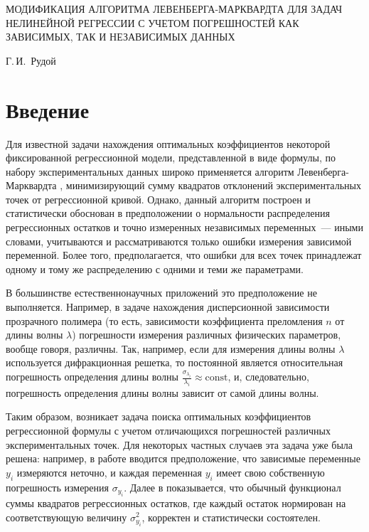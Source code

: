 \documentclass[11pt,a4paper]{article}
\begin{document}
\begin{center}
  МОДИФИКАЦИЯ АЛГОРИТМА ЛЕВЕНБЕРГА-МАРКВАРДТА ДЛЯ ЗАДАЧ НЕЛИНЕЙНОЙ РЕГРЕССИИ С УЧЕТОМ
  ПОГРЕШНОСТЕЙ КАК ЗАВИСИМЫХ, ТАК И НЕЗАВИСИМЫХ ДАННЫХ

  \bigskip
  Г.\,И.~Рудой
\end{center}

\section{Введение}

Для известной задачи нахождения оптимальных коэффициентов некоторой фиксированной
регрессионной модели, представленной в виде формулы, по набору экспериментальных
данных широко применяется алгоритм Левенберга-Марквардта
\cite{Marquardt1963Algorithm}, минимизирующий сумму квадратов отклонений
экспериментальных точек от регрессионной кривой. Однако, данный алгоритм построен
и статистически обоснован в предположении о нормальности распределения регрессионных
остатков и точно измеренных независимых переменных~--- иными словами, учитываются
и рассматриваются только ошибки измерения зависимой переменной. Более того,
предполагается, что ошибки для всех точек принадлежат одному и тому же распределению
с одними и теми же параметрами.

В большинстве естественнонаучных приложений это предположение не выполняется. Например, в задаче
нахождения дисперсионной зависимости прозрачного полимера (то есть, зависимости
коэффициента преломления $n$ от длины волны $\lambda$) погрешности измерения
различных физических параметров, вообще говоря, различны. Так, например, если
для измерения длины волны $\lambda$ используется дифракционная решетка, то постоянной
является относительная погрешность определения длины волны
$\frac{\sigma_{\lambda_i}}{\lambda_i} \approx \text{const}$, и, следовательно,
погрешность определения длины волны зависит от самой длины волны.

Таким образом, возникает задача поиска оптимальных коэффициентов регрессионной
формулы с учетом отличающихся погрешностей различных экспериментальных точек.
Для некоторых частных случаев эта задача уже была решена: например, 
в работе \cite{...} вводится предположение, что зависимые переменные $y_i$ измеряются
неточно, и каждая переменная $y_i$ имеет свою собственную погрешность измерения
$\sigma_{y_i}$. Далее в \cite{...} показывается, что обычный функционал суммы квадратов
регрессионных остатков, где каждый остаток нормирован на соответствующую величину
$\sigma_{y_i}^2$, корректен и статистически состоятелен.
\end{document}

